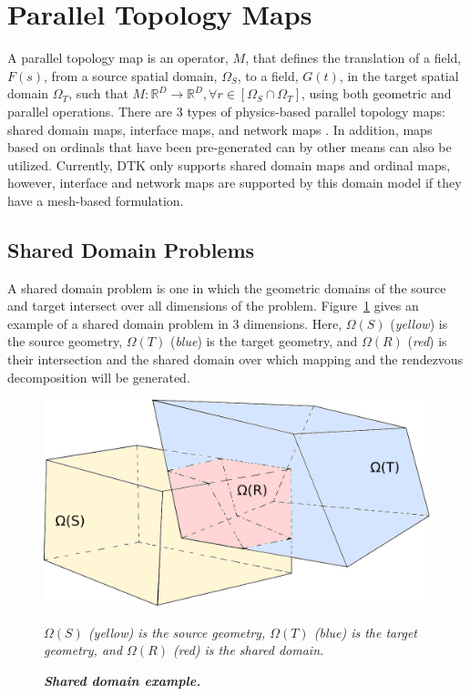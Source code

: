 \documentclass[letterpaper,12pt]{article}
\begin{document}
\section{Parallel Topology Maps}\label{sec:map}
A parallel topology map is an operator, $M$, that defines the
translation of a field, $F(s)$, from a source spatial domain,
$\Omega_S$, to a field, $G(t)$, in the target spatial domain
$\Omega_T$, such that $M: \mathbb{R}^D \rightarrow \mathbb{R}^D,
\forall r \in [\Omega_S \cap \Omega_T]$, using both geometric and
parallel operations. There are 3 types of physics-based parallel
topology maps: shared domain maps, interface maps, and network maps
\cite{LIME_2011}. In addition, maps based on ordinals that have been
pre-generated can by other means can also be utilized. Currently, DTK
only supports shared domain maps and ordinal maps, however, interface
and network maps are supported by this domain model if they have a
mesh-based formulation.

\subsection{Shared Domain Problems}\label{subsec:shared_domain}
A shared domain problem is one in which the geometric domains of the
source and target intersect over all dimensions of the
problem. Figure~\ref{fig:shared_domain} gives an example of a shared
domain problem in 3 dimensions. Here, $\Omega(S)$ ({\sl yellow}) is
the source geometry, $\Omega(T)$ ({\sl blue}) is the target geometry,
and $\Omega(R)$ ({\sl red}) is their intersection and the shared
domain over which mapping and the rendezvous decomposition will be
generated.

\begin{figure}[htpb!]
  \centering \includegraphics[width=5in]{overlapping_domain.pdf}
  \caption{\bf \sl Shared domain example.} {\sl $\Omega(S)$ (yellow)
    is the source geometry, $\Omega(T)$ (blue) is the target geometry,
    and $\Omega(R)$ (red) is the shared domain.}
  \label{fig:shared_domain}
\end{figure}
\end{document}
